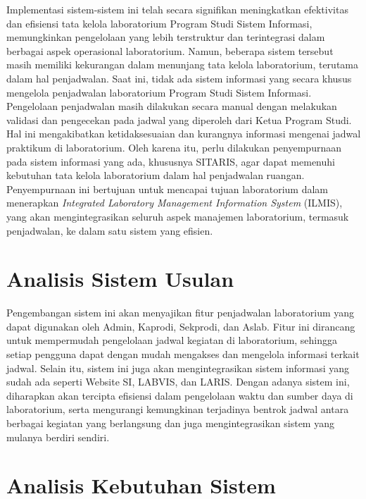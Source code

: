 Implementasi sistem-sistem ini telah secara signifikan meningkatkan efektivitas dan efisiensi tata kelola laboratorium Program Studi Sistem Informasi, memungkinkan pengelolaan yang lebih terstruktur dan terintegrasi dalam berbagai aspek operasional laboratorium. Namun, beberapa sistem tersebut masih memiliki kekurangan dalam menunjang tata kelola laboratorium, terutama dalam hal penjadwalan. Saat ini, tidak ada sistem informasi yang secara khusus mengelola penjadwalan laboratorium Program Studi Sistem Informasi. Pengelolaan penjadwalan masih dilakukan secara manual dengan melakukan validasi dan pengecekan pada jadwal yang diperoleh dari Ketua Program Studi. Hal ini mengakibatkan ketidaksesuaian dan kurangnya informasi mengenai jadwal praktikum di laboratorium. Oleh karena itu, perlu dilakukan penyempurnaan pada sistem informasi yang ada, khususnya SITARIS, agar dapat memenuhi kebutuhan tata kelola laboratorium dalam hal penjadwalan ruangan. Penyempurnaan ini bertujuan untuk mencapai tujuan laboratorium dalam menerapkan \textit{Integrated Laboratory Management Information System} (ILMIS), yang akan mengintegrasikan seluruh aspek manajemen laboratorium, termasuk penjadwalan, ke dalam satu sistem yang efisien.

\section{Analisis Sistem Usulan}
Pengembangan sistem ini akan menyajikan fitur penjadwalan laboratorium yang dapat digunakan oleh Admin, Kaprodi, Sekprodi, dan Aslab. Fitur ini dirancang untuk mempermudah pengelolaan jadwal kegiatan di laboratorium, sehingga setiap pengguna dapat dengan mudah mengakses dan mengelola informasi terkait jadwal. Selain itu, sistem ini juga akan mengintegrasikan sistem informasi yang sudah ada seperti Website SI, LABVIS, dan LARIS. Dengan adanya sistem ini, diharapkan akan tercipta efisiensi dalam pengelolaan waktu dan sumber daya di laboratorium, serta mengurangi kemungkinan terjadinya bentrok jadwal antara berbagai kegiatan yang berlangsung dan juga mengintegrasikan sistem yang mulanya berdiri sendiri.

\section{Analisis Kebutuhan Sistem}
